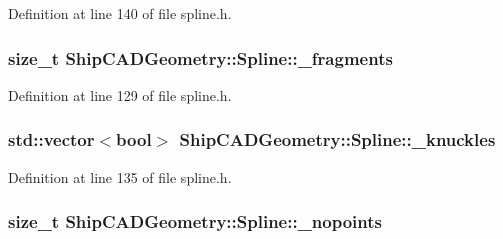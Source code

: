 Definition at line 140 of file spline.\-h.

\hypertarget{classShipCADGeometry_1_1Spline_afc73aefcc80c61121888a63abf687b40}{
\subsubsection[{\-\_\-fragments}]{\setlength{\rightskip}{0pt plus 5cm}size\-\_\-t Ship\-C\-A\-D\-Geometry\-::\-Spline\-::\-\_\-fragments\hspace{0.3cm}{\ttfamily [protected]}}}\label{classShipCADGeometry_1_1Spline_afc73aefcc80c61121888a63abf687b40}


Definition at line 129 of file spline.\-h.

\hypertarget{classShipCADGeometry_1_1Spline_a5bfae9fec6fa04634083bb7fa6ac9452}{
\subsubsection[{\-\_\-knuckles}]{\setlength{\rightskip}{0pt plus 5cm}std\-::vector$<$bool$>$ Ship\-C\-A\-D\-Geometry\-::\-Spline\-::\-\_\-knuckles\hspace{0.3cm}{\ttfamily [protected]}}}\label{classShipCADGeometry_1_1Spline_a5bfae9fec6fa04634083bb7fa6ac9452}


Definition at line 135 of file spline.\-h.

\hypertarget{classShipCADGeometry_1_1Spline_a0d0c8014132eda7835842d6a20ccdf74}{
\subsubsection[{\-\_\-nopoints}]{\setlength{\rightskip}{0pt plus 5cm}size\-\_\-t Ship\-C\-A\-D\-Geometry\-::\-Spline\-::\-\_\-nopoints\hspace{0.3cm}{\ttfamily [protected]}}}\label{classShipCADGeometry_1_1Spline_a0d0c8014132eda7835842d6a20ccdf74}


